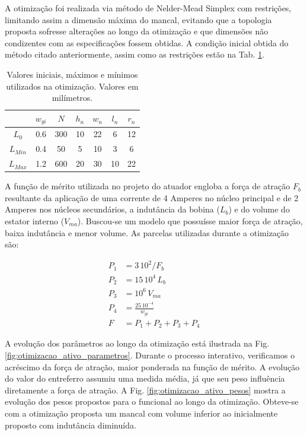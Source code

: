 A otimização foi realizada via método de Nelder-Mead Simplex com restrições, limitando assim a dimensão máxima do mancal, evitando que a topologia proposta sofresse alterações ao longo da otimização e que dimensões não condizentes com as especificações fossem obtidas. A condição inicial obtida do método citado anteriormente, assim como as restrições estão na Tab. \ref{tab:ativo:restrições}.

\begin{table}[ht!]
	\centering
	\begin{tabular}{c c c c c c c}
					 & $w_{gi}$ & $N$ & $h_n$ & $w_n$ & $l_n$ & $r_n$ \\ \hline \hline
		$L_{0}$  &  0.6 & 300  &   10 &  22 & 6  &   12 \\
		$L_{Min}$&  0.4 & 50   &   5  &  10 & 3  &   6	\\
		$L_{Max}$ & 1.2 & 600  &   20 &  30 & 10 &   22
	\end{tabular} 
	\caption{Valores iniciais, máximos e mínimos utilizados na otimização. Valores em milímetros.}
	\label{tab:ativo:restrições} 
\end{table}

A função de mérito utilizada no projeto do atuador engloba a força de atração $F_b$ resultante da aplicação de uma corrente de 4 Amperes no núcleo principal e de 2 Amperes nos núcleos secundários, a indutância da bobina ($L_b$) e do volume do estator interno ($V_{ma}$). Buscou-se um modelo que possuísse maior força de atração, baixa indutância e menor volume. As parcelas utilizadas durante a otimização são: 

\begin{align}
	P_1 &= 3 \, 10^2/ F_b \\
	P_2 &= 15 \, 10^4 \, L_b \\
	P_3 &= 10^6 \, V_{ma} \\
	P_4 &= \frac{25 \, 10^{-4}}{w_{gi}}				\\
	F   &= P_1 + P_2 + P_3 + P_4
\end{align}

A evolução dos parâmetros ao longo da otimização está ilustrada na Fig. \ref{fig:otimizacao_ativo_parametros}. Durante o processo interativo, verificamos o acréscimo da força de atração, maior ponderada na função de mérito.  A evolução do valor do entreferro assumiu uma medida média, já que seu peso influência diretamente a força de atração. A Fig. \ref{fig:otimizacao_ativo_pesos} mostra a evolução dos pesos propostos para o funcional ao longo da otimização. Obteve-se com a otimização proposta um mancal com volume inferior ao inicialmente proposto com indutância diminuída.

